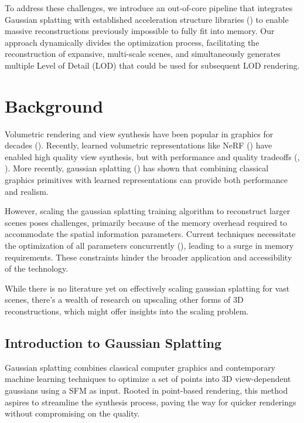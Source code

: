 \documentclass[logo,bsc,singlespacing,parskip]{infthesis}
\begin{document}
To address these challenges, we introduce an out-of-core pipeline that integrates Gaussian splatting with established acceleration structure libraries (\cite{pcl}) to enable massive reconstructions previously impossible to fully fit into memory. Our approach dynamically divides the optimization process, facilitating the reconstruction of expansive, multi-scale scenes, and simultaneously generates multiple Level of Detail (LOD) that could be used for subsequent LOD rendering.


\chapter{Background}

Volumetric rendering and view synthesis have been popular in graphics for decades (\cite{earlyrendering}). Recently, learned volumetric representations like NeRF (\cite{nerf}) have enabled high quality view synthesis, but with performance and quality tradeoffs (\cite{nerfoverview}, \cite{mipnerf}). More recently, gaussian splatting (\cite{splat}) has shown that combining classical graphics primitives with learned representations can provide both performance and realism.

However, scaling the gaussian splatting training algorithm to reconstruct larger scenes poses challenges, primarily because of the memory overhead required to accommodate the spatial information parameters. Current techniques necessitate the optimization of all parameters concurrently (\cite{splat}), leading to a surge in memory requirements. These constraints hinder the broader application and accessibility of the technology.

While there is no literature yet on effectively scaling gaussian splatting for vast scenes, there's a wealth of research on upscaling other forms of 3D reconstructions, which might offer insights into the scaling problem.

\section{Introduction to Gaussian Splatting}

Gaussian splatting combines classical computer graphics and contemporary machine learning techniques to optimize a set of points into 3D view-dependent gaussians using a SFM as input. Rooted in point-based rendering, this method aspires to streamline the synthesis process, paving the way for quicker renderings without compromising on the quality.
\end{document}
